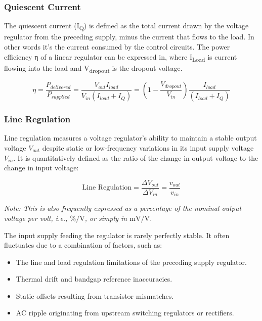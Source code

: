 \documentclass[
]{article}
\begin{document}
\subsubsection{Quiescent Current}\label{_quiescent_current}

The quiescent current (I\textsubscript{Q}) is defined as the total
current drawn by the voltage regulator from the preceding supply, minus
the current that flows to the load. In other words it's the current
consumed by the control circuits. The power efficiency η of a linear
regulator can be expressed in, where I\textsubscript{Load} is current
flowing into the load and V\textsubscript{dropout} is the dropout
voltage.

\[\eta = \frac{P_{delivered}}{P_{supplied}} = \frac{V_{out}I_{load}}{V_{in}(I_{load} + I_Q)}
= \left(1 - \frac{V_{dropout}}{V_{in}}\right)\frac{I_{load}}{(I_{load} + I_Q)}\]

\subsubsection{Line Regulation}\label{_line_regulation}

Line regulation measures a voltage regulator's ability to maintain a
stable output voltage \(V_{out}\) despite static or low-frequency
variations in its input supply voltage \(V_{in}\). It is quantitatively
defined as the ratio of the change in output voltage to the change in
input voltage:

\[\text{Line Regulation} = \frac{\Delta V_{out}}{\Delta V_{in}} = \frac{v_{out}}{v_{in}}\]

\emph{Note: This is also frequently expressed as a percentage of the
nominal output voltage per volt, i.e., \(\% / \text{V}\), or simply in
\(\text{mV}/\text{V}\).}

The input supply feeding the regulator is rarely perfectly stable. It
often fluctuates due to a combination of factors, such as:

\begin{itemize}
\item
  The line and load regulation limitations of the preceding supply
  regulator.
\item
  Thermal drift and bandgap reference inaccuracies.
\item
  Static offsets resulting from transistor mismatches.
\item
  AC ripple originating from upstream switching regulators or
  rectifiers.
\end{itemize}
\end{document}
